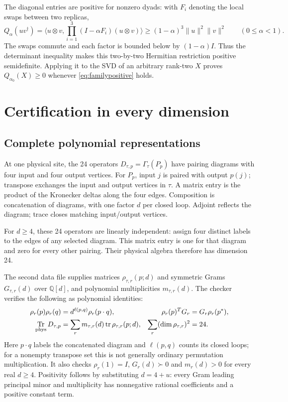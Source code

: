 \documentclass[10pt]{article}
\DeclareMathOperator{\Tr}{Tr}
\newcommand{\QQ}{\mathbb Q}
\newcommand{\al}{\alpha_0}
\begin{document}
The diagonal entries are positive for nonzero dyads: with $F_i$ denoting
the local swaps between two replicas,
\begin{equation}\label{eq:rankone}
 Q_\alpha(uv^\dagger)
 =\langle u\otimes v,\prod_{i=1}^3(I-\alpha F_i)(u\otimes v)\rangle
 \ge(1-\alpha)^3\|u\|^2\|v\|^2\qquad(0\le\alpha<1).
\end{equation}
The swaps commute and each factor is bounded below by $(1-\alpha)I$.
Thus the determinant inequality makes this two-by-two Hermitian restriction
positive semidefinite. Applying it to the SVD of an arbitrary rank-two $X$
proves $Q_{\al}(X)\ge0$ whenever \eqref{eq:familypositive} holds.

\section{Certification in every dimension}
\subsection*{Complete polynomial representations}
At one physical site, the 24 operators
$D_{\tau,p}=\Gamma_\tau(P_p)$ have pairing diagrams with four input and
four output vertices. For $P_p$, input $j$ is paired with output $p(j)$;
transpose exchanges the input and output vertices in $\tau$. A matrix entry
is the product of the Kronecker deltas along the four edges. Composition is
concatenation of diagrams, with one factor $d$ per closed loop. Adjoint
reflects the diagram; trace closes matching input/output vertices.

For $d\ge4$, these 24 operators are linearly independent: assign four
distinct labels to the edges of any selected diagram. This matrix entry
is one for that diagram and zero for every other pairing. Their physical
algebra therefore has dimension 24.

The second data file supplies matrices $\rho_{\tau,r}(p;d)$ and symmetric
Grams $G_{\tau,r}(d)$ over $\QQ[d]$, and polynomial multiplicities
$m_{\tau,r}(d)$. The checker verifies the following as polynomial identities:
\begin{align}
 \rho_r(p)\rho_r(q)&=d^{\ell(p,q)}\rho_r(p\cdot q),
 &\rho_r(p)^T G_r&=G_r\rho_r(p^*),\label{eq:algebra}\\
 \Tr_{\rm phys}D_{\tau,p}
 &=\sum_r m_{\tau,r}(d)\operatorname{tr}\rho_{\tau,r}(p;d),
 &\sum_r(\dim\rho_{\tau,r})^2&=24.\label{eq:traces}
\end{align}
Here $p\cdot q$ labels the concatenated diagram and $\ell(p,q)$ counts
its closed loops; for a nonempty transpose set this is not generally
ordinary permutation multiplication.
It also checks $\rho_r(1)=I$, $G_r(d)\succ0$ and $m_r(d)>0$ for every
real $d\ge4$. Positivity follows by substituting $d=4+u$: every Gram
leading principal minor and multiplicity has nonnegative rational
coefficients and a positive constant term.
\end{document}
